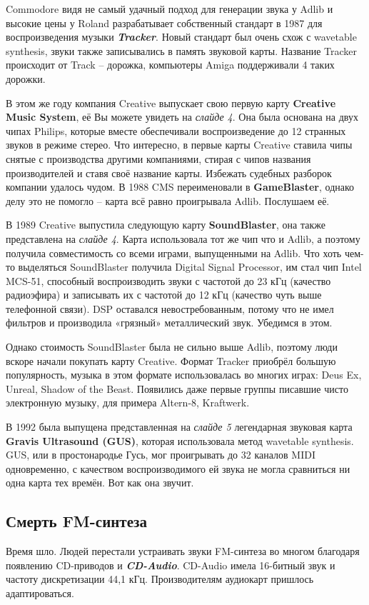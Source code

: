 \documentclass[a4paper,12pt]{extarticle}
\begin{document}
	Commodore видя не самый удачный подход для генерации звука у Adlib и высокие цены у Roland разрабатывает собственный стандарт в 1987 для воспроизведения музыки \textbf{\textit{Tracker}}. Новый стандарт был очень схож с wavetable synthesis, звуки также записывались в память звуковой карты. Название Tracker происходит от Track – дорожка, компьютеры Amiga поддерживали 4 таких дорожки.
	
	В этом же году компания Creative выпускает свою первую карту \textbf{Creative Music System}, её Вы можете увидеть на \textit{слайде 4}. Она была основана на двух чипах Philips, которые вместе обеспечивали воспроизведение до 12 странных звуков в режиме стерео. Что интересно, в первые карты Creative ставила чипы снятые с производства другими компаниями, стирая с чипов названия производителей и ставя своё название карты. Избежать судебных разборок компании удалось чудом. В 1988 CMS переименовали в \textbf{GameBlaster}, однако делу это не помогло – карта всё равно проигрывала Adlib. Послушаем её.
	
	В 1989 Creative выпустила следующую карту \textbf{SoundBlaster}, она также представлена на \textit{слайде 4}. Карта использовала тот же чип что и Adlib, а поэтому получила совместимость со всеми играми, выпущенными на Adlib. Что хоть чем-то выделяться SoundBlaster получила Digital Signal Processor, им стал чип Intel MCS-51, способный воспроизводить звуки с частотой до 23 кГц (качество радиоэфира) и записывать их с частотой до 12 кГц (качество чуть выше телефонной связи). DSP оставался невостребованным, потому что не имел фильтров и производила «грязный» металлический звук. Убедимся в этом.
	
	Однако стоимость SoundBlaster была не сильно выше Adlib, поэтому люди вскоре начали покупать карту Creative.
	Формат Tracker приобрёл большую популярность, музыка в этом формате использовалась во многих играх: Deus Ex, Unreal, Shadow of the Beast. Появились даже первые группы писавшие чисто электронную музыку, для примера Altern-8, Kraftwerk.
	
	В 1992 была выпущена представленная на \textit{слайде 5} легендарная звуковая карта \textbf{Gravis Ultrasound (GUS)}, которая использовала метод wavetable synthesis. GUS, или в простонародье Гусь, мог проигрывать до 32 каналов MIDI одновременно, с качеством воспроизводимого ей звука не могла сравниться ни одна карта тех времён. Вот как она звучит.
	
	\subsection{Смерть FM-синтеза}
	Время шло. Людей перестали устраивать звуки FM-синтеза во многом благодаря появлению CD-приводов и \textbf{\textit{CD-Audio}}. CD-Audio имела 16-битный звук и частоту дискретизации 44,1 кГц. Производителям аудиокарт пришлось адаптироваться.
	
\end{document}
